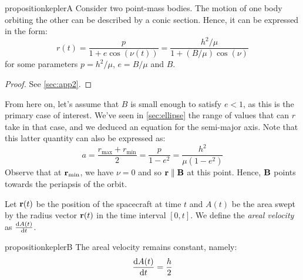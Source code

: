 \documentclass[../main.tex]{subfiles}
\begin{document}
\begin{restatable}{proposition}{keplerA}
  \label{prop:two-body}
  Consider two point-mass bodies. The motion of one body orbiting the other can be described by a conic section. Hence, it can be expressed in the form:
  \begin{equation}
    \label{eq:r_conic}
    r(t)=\frac{p}{1+e\cos (\nu(t))}=\frac{h^2/\mu}{1+(B/\mu)\cos(\nu)}
  \end{equation}
  for some parameters $p=h^2/\mu$, $e=B/\mu$ and $B$.
\end{restatable}
\begin{proof}
  See \cref{sec:app2}.
\end{proof}
From here on, let's assume that $B$ is small enough to satisfy $e <1$, as this is the primary case of interest. We've seen in \cref{sec:ellipse} the range of values that can $r$ take in that case, and we deduced an equation for the semi-major axis. Note that this latter quantity can also be expressed as:
\begin{equation}\label{eq:semi-major_axis}
  a=\frac{r_\mathrm{max}+r_\mathrm{min}}{2}=\frac{p}{1-e^2}=\frac{h^2}{\mu(1-e^2)}
\end{equation}
Observe that at $\boldsymbol{\mathrm{r}}_\mathrm{min}$, we have $\nu=0$ and so $\boldsymbol{\mathrm{r}}\parallel\boldsymbol{\mathrm{B}}$ at this point. Hence, $\boldsymbol{\mathrm{B}}$ points towards the periapsis of the orbit.
\begin{definition}
  Let $\boldsymbol{\mathrm{r}}(t)$ be the position of the spacecraft at time $t$ and $A(t)$ be the area swept by the radius vector $\boldsymbol{\mathrm{r}}(t)$ in the time interval $[0,t]$. We define the \emph{areal velocity} as $\dv{A(t)}{t}$.
\end{definition}
\begin{restatable}{proposition}{keplerB}
  \label{prop:kepler_second_law}
  The areal velocity remains constant, namely:
  \begin{equation}\label{eq:areal_velocity}
    \dv{A(t)}{t}=\frac{h}{2}
  \end{equation}
\end{restatable}
\end{document}
